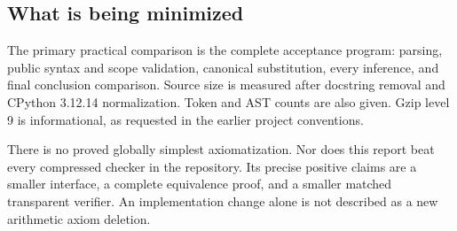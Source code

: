 \subsection{What is being minimized}
The primary practical comparison is the complete acceptance program: parsing, public syntax and scope validation, canonical substitution, every inference, and final conclusion comparison. Source size is measured after docstring removal and CPython 3.12.14  normalization. Token and AST counts are also given. Gzip level 9 is informational, as requested in the earlier project conventions.

There is no proved globally simplest axiomatization. Nor does this report beat every compressed checker in the repository. Its precise positive claims are a smaller interface, a complete equivalence proof, and a smaller matched transparent verifier. An implementation change alone is not described as a new arithmetic axiom deletion.
